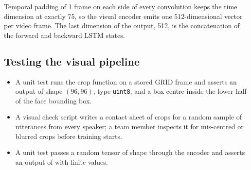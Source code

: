 Temporal padding of 1 frame on each side of every convolution keeps the time
dimension at exactly 75, so the visual encoder emits one 512-dimensional vector
per video frame. The last dimension of the output, 512, is the concatenation of
the forward and backward LSTM states.

\subsection{Testing the visual pipeline}
\begin{itemize}
  \item A unit test runs the crop function on a stored GRID frame and asserts an
        output of shape $(96,96)$, type \texttt{uint8}, and a box centre inside the
        lower half of the face bounding box.
  \item A visual check script writes a contact sheet of crops for a random
        sample of utterances from every speaker; a team member inspects it for
        mis-centred or blurred crops before training starts.
  \item A unit test passes a random tensor of shape  through
        the encoder and asserts an output of  with finite values.
\end{itemize}
